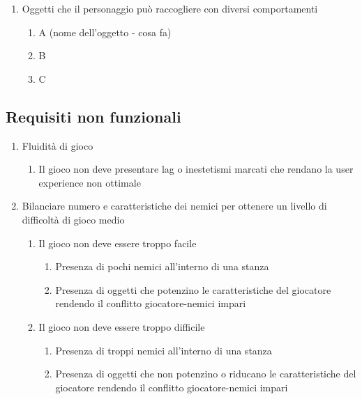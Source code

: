 \begin{enumerate}
    \item Oggetti che il personaggio può raccogliere con diversi comportamenti
    \begin{enumerate}
        \item A (nome dell'oggetto - cosa fa)
        \item B
        \item C
    \end{enumerate}
         
\end{enumerate}


\subsection{Requisiti non funzionali}

\begin{enumerate}
    \item Fluidità di gioco
    \begin{enumerate}
        \item Il gioco non deve presentare lag o inestetismi marcati che rendano la user experience non ottimale
    \end{enumerate}
    \item Bilanciare numero e caratteristiche dei nemici per ottenere un livello di difficoltà di gioco medio
    \begin{enumerate}
        \item Il gioco non deve essere troppo facile 
        \begin{enumerate}
            \item Presenza di pochi nemici all'interno di una stanza
            \item Presenza di oggetti che potenzino le caratteristiche del giocatore rendendo il conflitto giocatore-nemici impari
        \end{enumerate}
        \item Il gioco non deve essere troppo difficile
        \begin{enumerate}
            \item Presenza di troppi nemici all'interno di una stanza
            \item Presenza di oggetti che non potenzino o riducano le caratteristiche del giocatore rendendo il conflitto giocatore-nemici impari
        \end{enumerate}
    \end{enumerate}
\end{enumerate}


